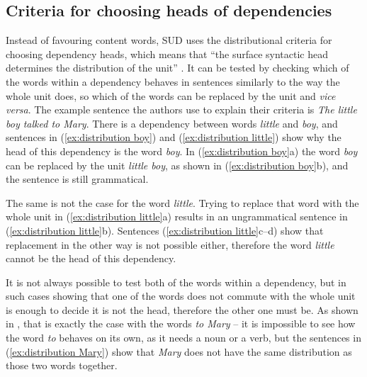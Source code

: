 \subsection{Criteria for choosing heads of dependencies}\label{sec:sud criteria}
Instead of favouring content words, SUD uses the distributional criteria for choosing dependency heads, which means that ``the surface syntactic head determines the distribution of the unit'' \citep{gerdes-etal-2018-sud}. It can be tested by checking which of the words within a dependency behaves in sentences similarly to the way the whole unit does, so which of the words can be replaced by the unit and \textsl{vice versa}. The example sentence the authors use to explain their criteria is \textsl{The little boy talked to Mary}. There is a dependency between words \textsl{little} and \textsl{boy}, and sentences in (\ref{ex:distribution boy}) and (\ref{ex:distribution little}) show why the head of this dependency is the word \textsl{boy}. In (\ref{ex:distribution boy}a) the word \textsl{boy} can be replaced by the unit \textsl{little boy}, as shown in (\ref{ex:distribution boy}b), and the sentence is still grammatical. 

\begin{exe}
    \ex
    \label{ex:distribution boy}
    \begin{xlist}
    \end{xlist}
\end{exe}

The same is not the case for the word \textsl{little}. Trying to replace that word with the whole unit in (\ref{ex:distribution little}a) results in an ungrammatical sentence in (\ref{ex:distribution little}b). Sentences (\ref{ex:distribution little}c--d) show that replacement in the other way is not possible either, therefore the word \textsl{little} cannot be the head of this dependency.

\begin{exe}
    \ex
    \label{ex:distribution little}
	\begin{xlist}
    \end{xlist}
\end{exe}

It is not always possible to test both of the words within a dependency, but in such cases showing that one of the words does not commute with the whole unit is enough to decide it is not the head, therefore the other one must be. As shown in \cite{gerdes-etal-2018-sud}, that is exactly the case with the words \textsl{to Mary} -- it is impossible to see how the word \textsl{to} behaves on its own, as it needs a noun or a verb, but the sentences in (\ref{ex:distribution Mary}) show that \textsl{Mary} does not have the same distribution as those two words together.

